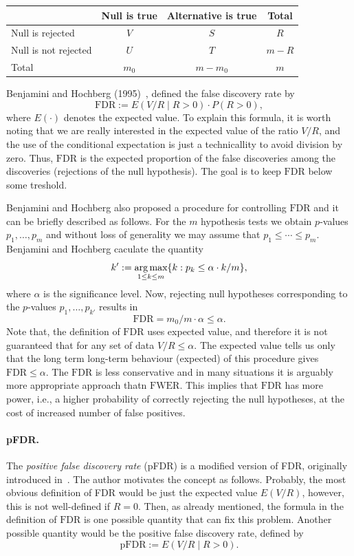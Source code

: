 \begin{center}
\begin{tabular}[h]{|l|c|c|c|}
\hline
& Null  is true & Alternative is true & Total\\
\hline
Null is rejected & $V$ & $S$ & $R$\\
\hline
Null is not rejected  & $U$ & $T$ & $m - R$\\
\hline
Total  & $m_0$ & $m - m_0$ & $m$\\
\hline
\end{tabular}
\end{center}

Benjamini and Hochberg (1995)~\cite{benjamini1995controlling}, defined the false discovery rate by
$$\text{FDR} := E(V/R \mid R > 0) \cdot P(R > 0),$$
where $E(\cdot)$ denotes the expected value.
To explain this formula, it is worth noting that we are really interested in the expected value of the ratio $V/R$, and the use of the conditional expectation is just a technicallity to avoid division by zero.
Thus, $\text{FDR}$ is the expected proportion of the false discoveries among the discoveries (rejections of the null hypothesis).
The goal is to keep $\text{FDR}$ below some treshold.


Benjamini and Hochberg also proposed a procedure for controlling $\text{FDR}$ and it can be briefly described as follows.
For the $m$ hypothesis tests we obtain $p$-values $p_1,\dots,p_m$ and without loss of generality we may assume that $p_1 \leq \cdots \leq p_m$.
Benjamini and Hochberg caculate the quantity
$$k' := \underset{1\leq k\leq m}{\text{arg\,max}}\{k : p_k \leq \alpha \cdot k/m\},$$
where $\alpha$ is the significance level.
Now, rejecting null hypotheses corresponding to the $p$-values $p_1,\dots,p_{k'}$ results in
$$\text{FDR} = m_0/m \cdot \alpha \leq \alpha.$$
Note that, the definition of $\text{FDR}$ uses expected value, and therefore it is not guaranteed that for any set of data $V/R \leq \alpha$.
The expected value tells us only that the long term long-term behaviour (expected) of this procedure gives $\text{FDR} \leq \alpha$.
The $\text{FDR}$ is less conservative and in many situations it is arguably more appropriate approach thatn $\text{FWER}$.
This implies that $\text{FDR}$ has more power, i.e., a higher probability of correctly rejecting the null hypotheses, at the cost of increased number of false positives.

\paragraph{pFDR.}
The \emph{positive false discovery rate} (pFDR) is a modified version of FDR, originally introduced in~\cite{storey2003positive}.
The author motivates the concept as follows.
Probably, the most obvious definition of FDR would be just the expected value $E(V/R)$, however, this is not well-defined if $R=0$.
Then, as already mentioned, the formula in the definition of $\text{FDR}$ is one possible quantity that can fix this problem.
Another possible quantity would be the positive false discovery rate, defined by
$$\text{pFDR} := E(V/R \mid R > 0).$$

